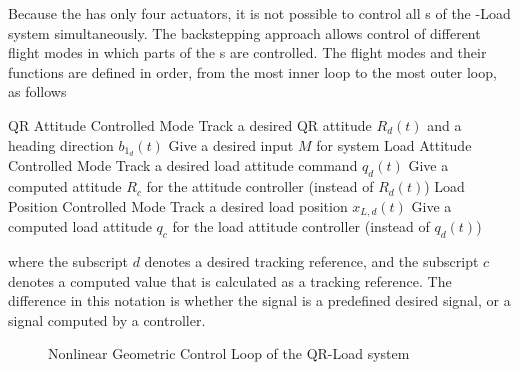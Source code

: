 Because the  has only four actuators, it is not possible to control all s of the -Load system simultaneously. The backstepping approach allows control of different flight modes in which parts of the s are controlled. The flight modes and their functions are defined in order, from the most inner loop to the most outer loop, as follows
\begin{outline}
\1 QR Attitude Controlled Mode 
\2 Track a desired QR attitude $ R_d(t) $ and a heading direction $ b_{1_d}(t) $
\2 Give a desired input $ M $ for system
\1 Load Attitude Controlled Mode 
\2 Track a desired load attitude command $ q_d(t) $
\2 Give a computed  attitude $ R_c $ for the  attitude controller (instead of $ R_d(t) $)
\1 Load Position Controlled Mode
\2 Track a desired load position $ x_{L,d}(t) $
\2 Give a computed load attitude $ q_c $ for the load attitude controller (instead of $q_d(t) $)
\end{outline}
where the subscript $d $ denotes a desired tracking reference, and the subscript $ c $ denotes a computed value that is calculated as a tracking reference. The difference in this notation is whether the signal is a predefined desired signal, or a signal computed by a controller.

\begin{figure}[h!]
	\centering
	\caption{Nonlinear Geometric Control Loop of the QR-Load system \cite{Sreenath2013c}\label{fig:con.loop}}
\end{figure}	

